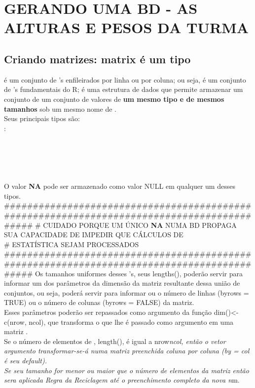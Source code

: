 \documentclass[]{article}
\begin{document}
\section{GERANDO UMA BD - AS ALTURAS E PESOS DA
TURMA}\label{gerando-uma-bd---as-alturas-e-pesos-da-turma}

\subsection{\texorpdfstring{Criando matrizes: matrix é um tipo
}{Criando matrizes: matrix é um  tipo }}\label{criando-matrizes-matrix-e-um-tipo}

 é um conjunto de 's enfileirados por linha ou por coluna; ou seja, é um
conjunto de 's fundamentais do R; é uma estrutura de dados que permite
armazenar um conjunto de um conjunto de valores de \textbf{um mesmo tipo
e de mesmos tamanhos} sob um mesmo nome de .\\
Seus principais tipos são:\\
: \\
\\
\\
\\
\\
\\
O valor \textbf{NA} pode ser armazenado como valor NULL em qualquer um
desses tipos.\\
\#\#\#\#\#\#\#\#\#\#\#\#\#\#\#\#\#\#\#\#\#\#\#\#\#\#\#\#\#\#\#\#\#\#\#\#\#\#\#\#\#\#\#\#\#\#\#\#\#\#\#\#\#\#\#\#\#\#\#\#\#\#\#\#\#\#\#\#\#\#\#\#\#\#\#\#\#\#\#\#\#\#\#\#\#\#\#\#\#\#\#
\# CUIDADO PORQUE UM ÚNICO \textbf{NA} NUMA BD PROPAGA SUA CAPACIDADE DE
IMPEDIR QUE CÁLCULOS DE\\
\# ESTATÍSTICA SEJAM PROCESSADOS\\
\#\#\#\#\#\#\#\#\#\#\#\#\#\#\#\#\#\#\#\#\#\#\#\#\#\#\#\#\#\#\#\#\#\#\#\#\#\#\#\#\#\#\#\#\#\#\#\#\#\#\#\#\#\#\#\#\#\#\#\#\#\#\#\#\#\#\#\#\#\#\#\#\#\#\#\#\#\#\#\#\#\#\#\#\#\#\#\#\#\#\#
Os tamanhos uniformes desses 's, seus lengths(), poderão servir para
informar um dos parâmetros da dimensão da matriz resultante dessa união
de conjuntos, ou seja, poderá servir para informar ou o número de linhas
(byrows = TRUE) ou o número de colunas (byrows = FALSE) da matriz.\\
Esses parâmetros poderão ser repassados como argumento da função
dim()\textless{}-c(nrow, ncol), que transforma o que lhe é passado como
argumento em uma matriz .\\
Se o número de elementos de , length(), é igual a nrow\emph{ncol, então
o vetor argumento transformar-se-á numa matriz preenchida coluna por
coluna (by = col é seu default).\\
Se seu tamanho for menor ou maior que o número de elementos da matriz
então sera aplicada Regra da Reciclagem até o preenchimento completo da
nova n}m.\\
\end{document}
